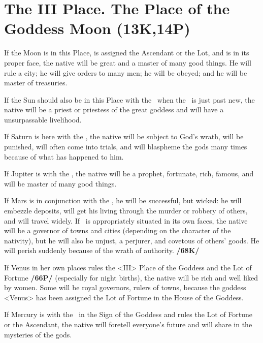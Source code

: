 \section{The III Place. The Place of the Goddess Moon (13K,14P)}
If the Moon is in this Place, is assigned the Ascendant or the Lot, and is in its proper face, the native will be great and a master of many good things. He will rule a city; he will give orders to many men; he will be obeyed; and he will be master of treasuries. 

If the Sun should also be in this Place with the \Moon\, when the \Moon\, is just past new, the native will be a priest or priestess of the great goddess and will have a unsurpassable livelihood. 

If Saturn is here with the \Moon, the native will be subject to God's wrath, will be punished, will often come into trials, and will blaspheme the gods many times because of what has happened to him. 

If Jupiter is with the \Moon, the native will be a prophet, fortunate, rich, famous, and will be master of many good things. 

If Mars is in conjunction with the \Moon, he will be successful, but wicked: he will embezzle deposits, will get his living through the murder or robbery of others, and will travel widely. If \Mars\, is appropriately situated in its own faces, the native will be a governor of towns and cities (depending on the character of the nativity), but he will also be unjust, a perjurer, and covetous of others’ goods. He will perish suddenly because of the wrath of authority. \textbf{/68K/} 

If Venus in her own places rules the <III> Place of the Goddess and the Lot of Fortune \textbf{/66P/} (especially for night births), the native will be rich and well liked by women. Some will be royal governors, rulers of towns, because the goddess <Venus> has been assigned the Lot of Fortune in the House of the Goddess. 

If Mercury is with the \Moon\, in the Sign of the Goddess and rules the Lot of Fortune or the Ascendant, the native will foretell everyone’s future and will share in the mysteries of the gods.

\newpage